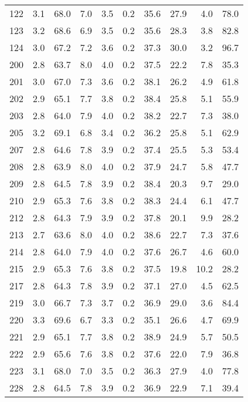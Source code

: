 \begin{table}[ht]
\begin{tabular}{rrrrrrrrrr}
    122 & 3.1 & 68.0 &  7.0 &  3.5 & 0.2 &   35.6 & 27.9 &  4.0 &  78.0 \\
    123 & 3.2 & 68.6 &  6.9 &  3.5 & 0.2 &   35.6 & 28.3 &  3.8 &  82.8 \\
    124 & 3.0 & 67.2 &  7.2 &  3.6 & 0.2 &   37.3 & 30.0 &  3.2 &  96.7 \\
    200 & 2.8 & 63.7 &  8.0 &  4.0 & 0.2 &   37.5 & 22.2 &  7.8 &  35.3 \\
    201 & 3.0 & 67.0 &  7.3 &  3.6 & 0.2 &   38.1 & 26.2 &  4.9 &  61.8 \\
    202 & 2.9 & 65.1 &  7.7 &  3.8 & 0.2 &   38.4 & 25.8 &  5.1 &  55.9 \\
    203 & 2.8 & 64.0 &  7.9 &  4.0 & 0.2 &   38.2 & 22.7 &  7.3 &  38.0 \\
    205 & 3.2 & 69.1 &  6.8 &  3.4 & 0.2 &   36.2 & 25.8 &  5.1 &  62.9 \\
    207 & 2.8 & 64.6 &  7.8 &  3.9 & 0.2 &   37.4 & 25.5 &  5.3 &  53.4 \\
    208 & 2.8 & 63.9 &  8.0 &  4.0 & 0.2 &   37.9 & 24.7 &  5.8 &  47.7 \\
    209 & 2.8 & 64.5 &  7.8 &  3.9 & 0.2 &   38.4 & 20.3 &  9.7 &  29.0 \\
    210 & 2.9 & 65.3 &  7.6 &  3.8 & 0.2 &   38.3 & 24.4 &  6.1 &  47.7 \\
    212 & 2.8 & 64.3 &  7.9 &  3.9 & 0.2 &   37.8 & 20.1 &  9.9 &  28.2 \\
    213 & 2.7 & 63.6 &  8.0 &  4.0 & 0.2 &   38.6 & 22.7 &  7.3 &  37.6 \\
    214 & 2.8 & 64.0 &  7.9 &  4.0 & 0.2 &   37.6 & 26.7 &  4.6 &  60.0 \\
    215 & 2.9 & 65.3 &  7.6 &  3.8 & 0.2 &   37.5 & 19.8 & 10.2 &  28.2 \\
    217 & 2.8 & 64.3 &  7.8 &  3.9 & 0.2 &   37.1 & 27.0 &  4.5 &  62.5 \\
    219 & 3.0 & 66.7 &  7.3 &  3.7 & 0.2 &   36.9 & 29.0 &  3.6 &  84.4 \\
    220 & 3.3 & 69.6 &  6.7 &  3.3 & 0.2 &   35.1 & 26.6 &  4.7 &  69.9 \\
    221 & 2.9 & 65.1 &  7.7 &  3.8 & 0.2 &   38.9 & 24.9 &  5.7 &  50.5 \\
    222 & 2.9 & 65.6 &  7.6 &  3.8 & 0.2 &   37.6 & 22.0 &  7.9 &  36.8 \\
    223 & 3.1 & 68.0 &  7.0 &  3.5 & 0.2 &   36.3 & 27.9 &  4.0 &  77.8 \\
    228 & 2.8 & 64.5 &  7.8 &  3.9 & 0.2 &   36.9 & 22.9 &  7.1 &  39.4 \\

\end{tabular}
\end{table}
